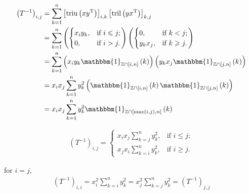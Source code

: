 \documentclass[11pt]{article}
\newcommand{\triu}{\mathop{\mathrm{triu}}}
\newcommand{\tril}{\mathop{\mathrm{tril}}}
\newcommand{\T}{\mathrm{T}}
\begin{document}
\begin{align*}
    \left( T^{-1} \right)_{i,j} &= \sum_{k=1}^{n} 
            \left[\triu\left(x y^{\T}\right)\right]_{i,k}
            \left[\tril\left(y x^{\T}\right)\right]_{k,j} \\
        &= \sum_{k=1}^{n}
            \left( \begin{cases}
                x_{i} y_{k} ,&  \text{if } i \leqslant j ; \\ 
                0           ,&  \text{if } i > j .
                   \end{cases}\right)
            \left( \begin{cases}
                0           ,&  \text{if } k < j ; \\ 
                y_{k} x_{j} ,&  \text{if } k \geqslant j .
                   \end{cases}\right) \\
        &= \sum_{k=1}^{n}
            \left(x_{i} y_{k} \mathbbm{1}_{\mathbb{Z} \cap \left[i,n\right]}\left( k \right)\right)
            \left(y_{k} x_{j} \mathbbm{1}_{\mathbb{Z} \cap \left[j,n\right]}\left( k \right)\right) \\
        &= x_{i} x_{j} \sum_{k=1}^{n}
            y_{k}^2 \left( \mathbbm{1}_{\mathbb{Z} \cap \left[i,n\right]}\left( k \right)
            \mathbbm{1}_{\mathbb{Z} \cap \left[j,n\right]}\left( k \right)\right) \\
        &= x_{i} x_{j} \sum_{k=1}^{n}
            y_{k}^2 \mathbbm{1}_{\mathbb{Z} \cap \left[\max\left(i,j \right),n\right]}\left( k \right) \\
\end{align*}

\begin{align}
    \left( T^{-1} \right)_{i,j} = 
    \begin{cases}
        x_{i} x_{j} \sum_{k=j}^{n} y_{k}^2 ,&  \text{if } i \leqslant j ; \\ 
        x_{j} x_{i} \sum_{k=i}^{n} y_{k}^2 ,&  \text{if } i \geqslant j .
    \end{cases}
\end{align}


for $i = j$,
\begin{align*}
    \left( T^{-1} \right)_{i,i} = x_{i}^2 \sum_{k=i}^{n} y_{k}^2
        = x_{j}^2 \sum_{k=j}^{n} y_{k}^2 = \left( T^{-1} \right)_{j,j}
\end{align*}
\end{document}
